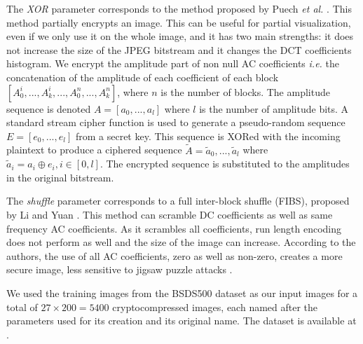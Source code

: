 \documentclass{article}
\begin{document}

The \textit{XOR} parameter corresponds to the method proposed by Puech \textit{et al.} \cite{fernandez2012advanced}. This method partially encrypts an image. This can be useful for partial visualization, even if we only use it on the whole image, and it has two main strengths: it does not increase the size of the JPEG bitstream and it changes the DCT coefficients histogram. We encrypt the amplitude part of non null AC coefficients \textit{i.e.} the concatenation of the amplitude of each coefficient of each block $[A_0^i,..., A_k^i,..., A_0^n,..., A_k^n]$, where $n$ is the number of blocks. The amplitude sequence is denoted $A = [a_0,..., a_l]$ where $l$ is the number of amplitude bits. A standard stream cipher function is used to generate a pseudo-random sequence $E = [e_0,..., e_l]$ from a secret key. This sequence is XORed with the incoming plaintext to produce a ciphered sequence $\widetilde{A} = \widetilde{a}_0,..., \widetilde{a}_l$ where $\widetilde{a}_i = a_i \oplus e_i, i \in [0,l]$. The encrypted sequence is substituted to the amplitudes in the original bitstream.

The \textit{shuffle} parameter corresponds to a full inter-block shuffle (FIBS), proposed by Li and Yuan \cite{li2007leak}. This method can scramble DC coefficients as well as same frequency AC coefficients. As it scrambles all coefficients, run length encoding does not perform as well and the size of the image can increase. According to the authors, the use of all AC coefficients, zero as well as non-zero, creates a more secure image, less sensitive to jigsaw puzzle attacks \cite{}.

We used the training images from the BSDS500 \cite{amfm_pami2011} dataset as our input images for a total of $27 \times 200 = 5400$ cryptocompressed images, each named after the parameters used for its creation and its original name. The dataset is available at \cite{}.

\end{document}
